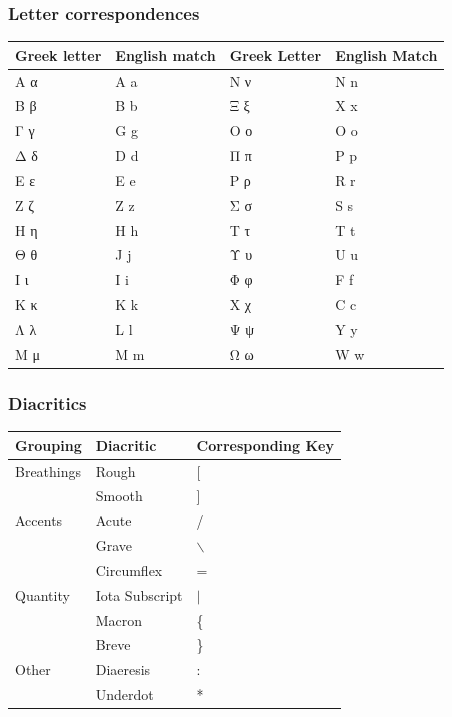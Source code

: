 \documentclass[11pt]{article}
\begin{document}
\subsubsection{Letter correspondences}
\label{sec:org0f40a12}

\begin{center}
\begin{tabular}{ll|ll}
Greek letter & English match & Greek Letter & English Match\\
\hline
Α α & A a & Ν ν & N n\\
Β β & B b & Ξ ξ & X x\\
Γ γ & G g & Ο ο & O o\\
Δ δ & D d & Π π & P p\\
Ε ε & E e & Ρ ρ & R r\\
Ζ ζ & Z z & Σ σ & S s\\
Η η & H h & Τ τ & T t\\
Θ θ & J  j & Υ υ & U u\\
Ι ι & I i & Φ φ & F f\\
Κ κ & K k & Χ χ & C c\\
Λ λ & L l & Ψ ψ & Y y\\
Μ μ & M m & Ω ω & W w\\
\end{tabular}
\end{center}

\subsubsection{Diacritics}
\label{sec:org4f6dca5}

\begin{center}
\begin{tabular}{lll}
Grouping & Diacritic & Corresponding Key\\
\hline
Breathings & Rough & [\\
 & Smooth & ]\\
Accents & Acute & /\\
 & Grave & $\backslash$\\
 & Circumflex & =\\
Quantity & Iota Subscript & \(\vert{}\)\\
 & Macron & \{\\
 & Breve & \}\\
Other & Diaeresis & :\\
 & Underdot & *\\
\end{tabular}
\end{center}
\end{document}

